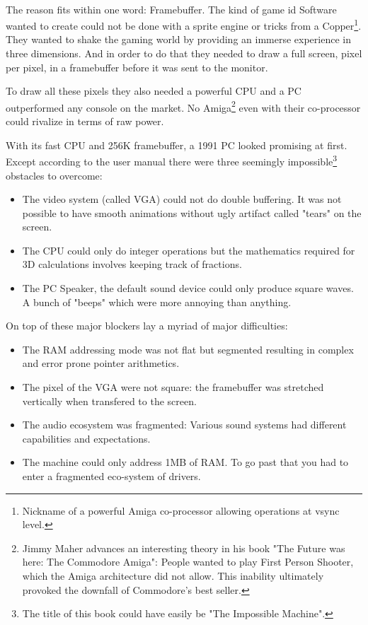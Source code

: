 \\
The reason fits within one word: Framebuffer. The kind of game id Software wanted to create could not be done with a sprite engine or tricks from a Copper\footnote{Nickname of a powerful Amiga co-processor allowing operations at vsync level.}. They wanted to shake the gaming world by providing an immerse experience in three dimensions. And in order to do that they needed to draw a full screen, pixel per pixel, in a framebuffer before it was sent to the monitor. \\
\par
To draw all these pixels they also needed a powerful CPU and a PC outperformed any console on the market. No Amiga\footnote{Jimmy Maher advances an interesting theory in his book "The Future was here: The Commodore Amiga": People wanted to play First Person Shooter, which the Amiga architecture did not allow. This inability ultimately provoked the downfall of Commodore's best seller.} even with their co-processor could rivalize in terms of raw power.
\par


 
With its fast CPU and 256K framebuffer, a 1991 PC looked promising at first. Except according to the user manual there were three seemingly impossible\footnote{The title of this book could have easily be "The Impossible Machine".} obstacles to overcome:\\
\begin{itemize}
\item The video system (called VGA) could not do double buffering. It was not possible to have smooth animations without ugly artifact called "tears" on the screen.
\item The CPU could only do integer operations but the mathematics required for 3D calculations involves keeping track of fractions.
\item The PC Speaker, the default sound device could only produce square waves. A bunch of "beeps" which were more annoying than anything.
\end{itemize}
On top of these major blockers lay a myriad of major difficulties:\\
\begin{itemize}
\item The RAM addressing mode was not flat but segmented resulting in complex and error prone pointer arithmetics.
\item The pixel of the VGA were not square: the framebuffer was stretched vertically when
transfered to the screen.
\item The audio ecosystem was fragmented: Various sound systems had different capabilities and expectations.
\item The machine could only address 1MB of RAM. To go past that you had to enter a fragmented eco-system of drivers.
\end{itemize}

